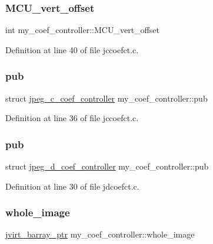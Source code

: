 \subsubsection{\texorpdfstring{MCU\_vert\_offset}{MCU\_vert\_offset}}
{\footnotesize\ttfamily int my\+\_\+coef\+\_\+controller\+::\+M\+C\+U\+\_\+vert\+\_\+offset}



Definition at line 40 of file jccoefct.\+c.

\mbox{\label{structmy__coef__controller_a5585d883f38ce6d73d0d2fb31457f4e5}} 
\subsubsection{\texorpdfstring{pub}{pub}\hspace{0.1cm}{\footnotesize\ttfamily [1/2]}}
{\footnotesize\ttfamily struct \mbox{\hyperlink{structjpeg__c__coef__controller}{jpeg\+\_\+c\+\_\+coef\+\_\+controller}} my\+\_\+coef\+\_\+controller\+::pub}



Definition at line 36 of file jccoefct.\+c.

\mbox{\label{structmy__coef__controller_a09524018020a2d7edbbcd92400f0919a}} 
\subsubsection{\texorpdfstring{pub}{pub}\hspace{0.1cm}{\footnotesize\ttfamily [2/2]}}
{\footnotesize\ttfamily struct \mbox{\hyperlink{structjpeg__d__coef__controller}{jpeg\+\_\+d\+\_\+coef\+\_\+controller}} my\+\_\+coef\+\_\+controller\+::pub}



Definition at line 30 of file jdcoefct.\+c.

\mbox{\label{structmy__coef__controller_aedc0b0cdda57a7f9e8c49770995b12b4}} 
\subsubsection{\texorpdfstring{whole\_image}{whole\_image}\hspace{0.1cm}{\footnotesize\ttfamily [1/2]}}
{\footnotesize\ttfamily \mbox{\hyperlink{jpeglib_8h_a994f4cba141d82ded90af38e51223f0b}{jvirt\+\_\+barray\+\_\+ptr}} my\+\_\+coef\+\_\+controller\+::whole\+\_\+image}



